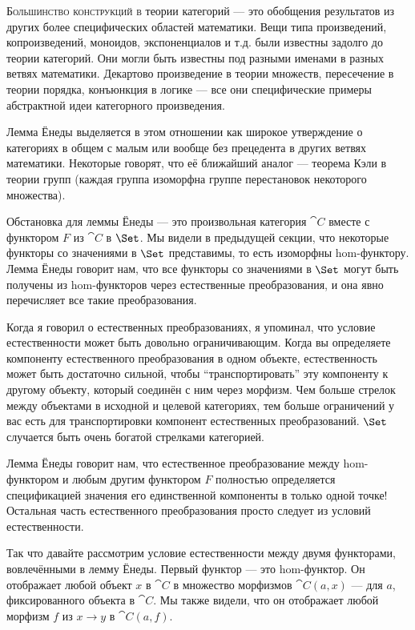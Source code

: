 
\lettrine[lhang=0.17]{Б}{ольшинство конструкций в} теории категорий --- это обобщения результатов
из других более специфических областей математики. Вещи типа произведений,
копроизведений, моноидов, экспоненциалов и т.д. были известны задолго до
теории категорий. Они могли быть известны под разными именами в
разных ветвях математики. Декартово произведение в теории множеств,
пересечение в теории порядка, конъюнкция в логике --- все они специфические
примеры абстрактной идеи категорного произведения.

Лемма Ёнеды выделяется в этом отношении как широкое утверждение
о категориях в общем с малым или вообще без прецедента в других
ветвях математики. Некоторые говорят, что её ближайший аналог --- теорема
Кэли в теории групп (каждая группа изоморфна группе перестановок
некоторого множества).

Обстановка для леммы Ёнеды --- это произвольная категория $\cat{C}$
вместе с функтором $F$ из $\cat{C}$ в $\Set$. Мы
видели в предыдущей секции, что некоторые функторы со значениями в $\Set$
представимы, то есть изоморфны hom-функтору. Лемма Ёнеды
говорит нам, что все функторы со значениями в $\Set$ могут быть получены из
hom-функторов через естественные преобразования, и она явно
перечисляет все такие преобразования.

Когда я говорил о естественных преобразованиях, я упоминал, что
условие естественности может быть довольно ограничивающим. Когда вы определяете
компоненту естественного преобразования в одном объекте, естественность может быть
достаточно сильной, чтобы ``транспортировать'' эту компоненту к другому объекту, который
соединён с ним через морфизм. Чем больше стрелок между объектами в
исходной и целевой категориях, тем больше ограничений у вас
есть для транспортировки компонент естественных преобразований.
$\Set$ случается быть очень богатой стрелками категорией.

Лемма Ёнеды говорит нам, что естественное преобразование между
hom-функтором и любым другим функтором $F$ полностью определяется
спецификацией значения его единственной компоненты в только одной точке! Остальная часть
естественного преобразования просто следует из условий естественности.

Так что давайте рассмотрим условие естественности между двумя функторами,
вовлечёнными в лемму Ёнеды. Первый функтор --- это hom-функтор. Он
отображает любой объект $x$ в $\cat{C}$ в множество морфизмов
$\cat{C}(a, x)$ --- для $a$, фиксированного объекта в $\cat{C}$. Мы также
видели, что он отображает любой морфизм $f$ из $x \to y$ в $\cat{C}(a, f)$.

